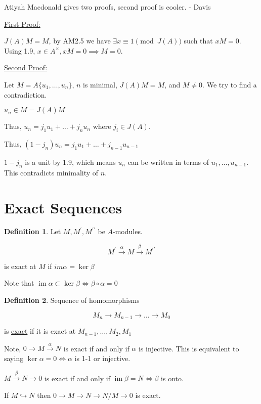 \documentclass{article}
\theoremstyle{definition}
\newtheorem{definition}{Definition}
\newcommand{\im}{\operatorname{im}}
\begin{document}
Atiyah Macdonald gives two proofs, second proof is cooler. - Davis

\underline{First Proof:}

\(J(A)M = M\), by AM2.5 we have \(\exists x\equiv 1\pmod{J(A)}\) such that \(xM = 0\). Using 1.9, \(x\in A^\times, xM=0 \implies M = 0\).

\underline{Second Proof:}

Let \(M = A \{ u_1, \dots, u_n  \} \), \(n\) is minimal, \(J(A)M = M\), and \(M \neq 0\). We try to find a contradiction.

\(u_n\in M = J(A)M\)

Thus, \(u_n = j_1 u_1 + \dots + j_n u_n \) where \(j_i \in J(A)\).

Thus, \((1-j_n)u_n = j_1 u_1 + \dots + j_{n-1}u_{n-1}\) 

\(1 - j_n\) is a unit by 1.9, which means \(u_n\) can be written in terms of \(u_1, \dots , u_{n-1}\). This contradicts minimality of \(n\).

\section*{Exact Sequences}

\begin{definition}
    Let \(M,M^{\prime} ,M^{\prime\prime} \) be \(A\)-modules.

    \[
        M^{\prime} \overset{\alpha }{\to} M \overset{\beta}{\to} M^{\prime\prime} 
    \]

    is exact at \(M\) if \(im \alpha = \ker \beta\) 
\end{definition}

Note that \(\im \alpha \subset \ker \beta \iff \beta \circ \alpha = 0\) 

\begin{definition}
    Sequence of homomorphisms

    \[
        M_n \to M_{n-1} \to \dots \to M_0 
    \]

    is \underline{exact} if it is exact at \(M_{n-1}, \dots , M_2,M_1\) 
\end{definition}

Note, \(0 \to M \overset{\alpha }{\to} N\) is exact if and only if \(\alpha \) is injective. This is equivalent to saying \(\ker \alpha = 0 \iff  \alpha \) is 1-1 or injective.

\(M \overset{\beta}{\to} N \to 0\)  is exact if and only if \(\im \beta = N \iff  \beta\) is onto.

If \(M \hookrightarrow N\) then \(0 \to M \to N \to N / M \to 0\) is exact.
\end{document}
